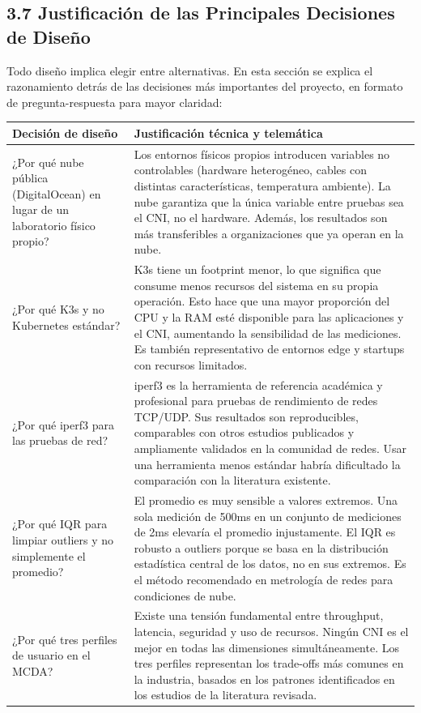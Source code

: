 \documentclass[journal]{IEEEtran}
\begin{document}
\subsection{3.7 Justificación de las Principales Decisiones de Diseño}

Todo diseño implica elegir entre alternativas. En esta sección se explica el razonamiento detrás de las decisiones más importantes del proyecto, en formato de pregunta-respuesta para mayor claridad:

\begin{table}[htbp]
\centering
\scriptsize
\begin{tabularx}{\textwidth}{|Y|Y|}
\hline
\textbf{Decisión de diseño} & \textbf{Justificación técnica y telemática} \\
\hline
¿Por qué nube pública (DigitalOcean) en lugar de un laboratorio físico propio? & Los entornos físicos propios introducen variables no controlables (hardware heterogéneo, cables con distintas características, temperatura ambiente). La nube garantiza que la única variable entre pruebas sea el CNI, no el hardware. Además, los resultados son más transferibles a organizaciones que ya operan en la nube. \\
¿Por qué K3s y no Kubernetes estándar? & K3s tiene un footprint menor, lo que significa que consume menos recursos del sistema en su propia operación. Esto hace que una mayor proporción del CPU y la RAM esté disponible para las aplicaciones y el CNI, aumentando la sensibilidad de las mediciones. Es también representativo de entornos edge y startups con recursos limitados. \\
¿Por qué iperf3 para las pruebas de red? & iperf3 es la herramienta de referencia académica y profesional para pruebas de rendimiento de redes TCP/UDP. Sus resultados son reproducibles, comparables con otros estudios publicados y ampliamente validados en la comunidad de redes. Usar una herramienta menos estándar habría dificultado la comparación con la literatura existente. \\
¿Por qué IQR para limpiar outliers y no simplemente el promedio? & El promedio es muy sensible a valores extremos. Una sola medición de 500ms en un conjunto de mediciones de 2ms elevaría el promedio injustamente. El IQR es robusto a outliers porque se basa en la distribución estadística central de los datos, no en sus extremos. Es el método recomendado en metrología de redes para condiciones de nube. \\
¿Por qué tres perfiles de usuario en el MCDA? & Existe una tensión fundamental entre throughput, latencia, seguridad y uso de recursos. Ningún CNI es el mejor en todas las dimensiones simultáneamente. Los tres perfiles representan los trade-offs más comunes en la industria, basados en los patrones identificados en los estudios de la literatura revisada. \\

\end{tabularx}
\end{table}
\end{document}
